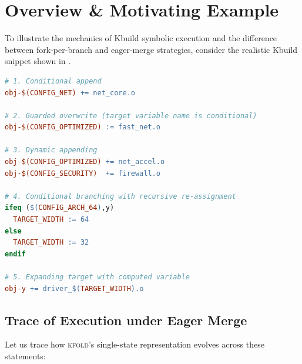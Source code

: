 \documentclass[acmsmall,screen,review]{acmart}
\newcommand{\tool}{\textsc{kfold}\xspace}
\begin{document}
\section{Overview \& Motivating Example}
\label{sec:overview}

To illustrate the mechanics of Kbuild symbolic execution and the difference between fork-per-branch and eager-merge strategies, consider the realistic Kbuild snippet shown in .

\begin{lstlisting}[language=make,caption={A motivating Kbuild example exhibiting conditional selection, guarded overwrites, and flavor expansion.},label={lst:example}]
# 1. Conditional append
obj-$(CONFIG_NET) += net_core.o

# 2. Guarded overwrite (target variable name is conditional)
obj-$(CONFIG_OPTIMIZED) := fast_net.o

# 3. Dynamic appending
obj-$(CONFIG_OPTIMIZED) += net_accel.o
obj-$(CONFIG_SECURITY)  += firewall.o

# 4. Conditional branching with recursive re-assignment
ifeq ($(CONFIG_ARCH_64),y)
  TARGET_WIDTH := 64
else
  TARGET_WIDTH := 32
endif

# 5. Expanding target with computed variable
obj-y += driver_$(TARGET_WIDTH).o
\end{lstlisting}

\subsection{Trace of Execution under Eager Merge}
\label{sec:overview:trace}

Let us trace how \tool's single-state representation evolves across these statements:
\end{document}
